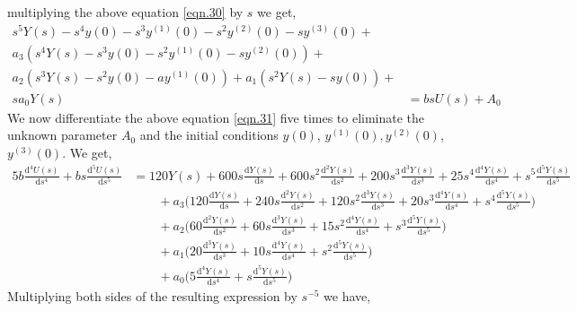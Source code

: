 \documentclass{article}
\begin{document}
multiplying the above equation \eqref{eqn.30} by $s$ we get,
\begin{equation}\label{eqn.31}
\begin{split}
s^5Y(s) - s^4y(0) - s^3y^{(1)}(0) - s^2y^{(2)}(0) - sy^{(3)}(0) + & \\
a_{3}(s^4Y(s) - s^3y(0) - s^2y^{(1)}(0) - sy^{(2)}(0)) + & \\
a_{2}(s^3Y(s) - s^2y(0) - ay^{(1)}(0)) + a_{1}(s^2Y(s)-sy(0)) + &\\
sa_{0}Y(s) &= bs U(s) + A_{0}
\end{split}
\end{equation}
We now differentiate the above equation \eqref{eqn.31} five times to eliminate the unknown parameter $A_{0}$ and the initial conditions $y(0)$, $y^{(1)}(0), y^{(2)}(0)$, $y^{(3)}(0)$. We get,
\begin{equation}\label{eqn.32}
\begin{split}
5b\frac{\mathrm{d}^4U(s)}{\mathrm{d}s^4} + bs\frac{\mathrm{d}^5U(s)}{\mathrm{d}s^5} & = 120Y(s) + 600s\frac{\mathrm{d}Y(s)}{\mathrm{d}s} + 600s^2\frac{\mathrm{d}^2Y(s)}{\mathrm{d}s^2} + 200s^3\frac{\mathrm{d}^3Y(s)}{\mathrm{d}s^3} + 25s^4\frac{\mathrm{d}^4Y(s)}{\mathrm{d}s^4} + s^5 \frac{\mathrm{d}^5Y(s)}{\mathrm{d}s^5} \, \\
&\qquad{} + a_3\bigg(120\frac{\mathrm{d}Y(s)}{\mathrm{d}s} + 240s\frac{\mathrm{d}^2Y(s)}{\mathrm{d}s^2} + 120s^2\frac{\mathrm{d}^3Y(s)}{\mathrm{d}s^3} + 20s^3\frac{\mathrm{d}^4Y(s)}{\mathrm{d}s^4} + s^4 \frac{\mathrm{d}^5Y(s)}{\mathrm{d}s^5}\bigg) \, \\
&\qquad{} + a_2\bigg(60\frac{\mathrm{d}^2Y(s)}{\mathrm{d}s^2} + 60s\frac{\mathrm{d}^3Y(s)}{\mathrm{d}s^3} + 15s^2\frac{\mathrm{d}^4Y(s)}{\mathrm{d}s^4} + s^3\frac{\mathrm{d}^5Y(s)}{\mathrm{d}s^5} \bigg) \, \\  
&\qquad{} + a_1\bigg(20\frac{\mathrm{d}^3Y(s)}{\mathrm{d}s^3} + 10s\frac{\mathrm{d}^4Y(s)}{\mathrm{d}s^4} + s^2\frac{\mathrm{d}^5Y(s)}{\mathrm{d}s^5} \bigg) \, \\
&\qquad{} + a_0\bigg(5\frac{\mathrm{d}^4Y(s)}{\mathrm{d}s^4} + s\frac{\mathrm{d}^5Y(s)}{\mathrm{d}s^5} \bigg)
\end{split}
\end{equation}
Multiplying both sides of the resulting expression by $s^{-5}$ we have,
\end{document}

